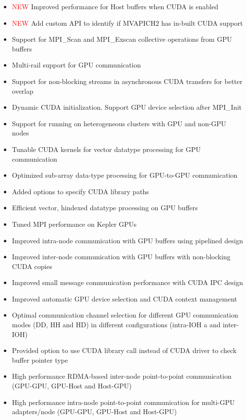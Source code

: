 \begin{itemize}
   \begin{itemize}
      \item \textcolor{red}{NEW} Improved performance for Host buffers when CUDA
          is enabled
      \item \textcolor{red}{NEW} Add custom API to identify if MVAPICH2 has in-built CUDA support
      \item Support for MPI\_Scan and MPI\_Exscan collective operations from GPU buffers
      \item Multi-rail support for GPU communication
      \item Support for non-blocking streams in asynchronous CUDA transfers for better overlap
      \item Dynamic CUDA initialization. Support GPU device selection after MPI\_Init
      \item Support for running on heterogeneous clusters with GPU and non-GPU nodes
      \item Tunable CUDA kernels for vector datatype processing for GPU communication
      \item Optimized sub-array data-type processing for GPU-to-GPU communication
      \item Added options to specify CUDA library paths
      \item Efficient vector, hindexed datatype processing on GPU buffers
      \item Tuned MPI performance on Kepler GPUs
      \item Improved intra-node communication with GPU buffers using pipelined design
      \item Improved inter-node communication with GPU buffers with non-blocking CUDA copies
      \item Improved small message communication performance with CUDA IPC design
      \item Improved automatic GPU device selection and CUDA context management
      \item Optimal communication channel selection for different GPU communication 
           modes (DD, HH and HD) in different configurations (intra-IOH a and inter-IOH)
      \item Provided option to use CUDA library call instead of CUDA driver to check buffer pointer type
      \item  High performance RDMA-based 
           inter-node point-to-point 
           communication (GPU-GPU, GPU-Host and Host-GPU)

      \item  High performance intra-node point-to-point communication
           for multi-GPU adapters/node (GPU-GPU, GPU-Host and Host-GPU) 


\end{itemize}
\end{itemize}
